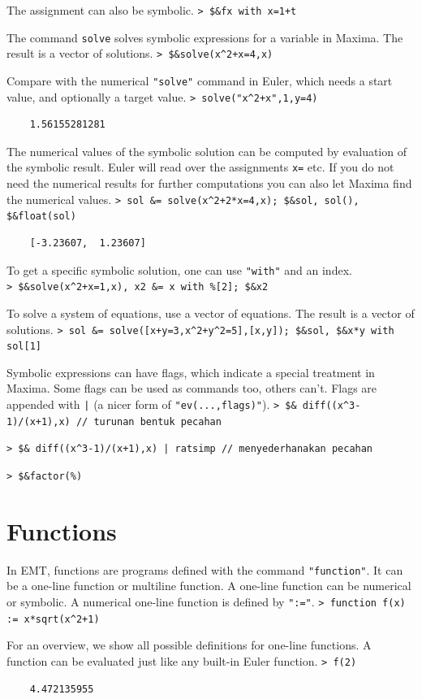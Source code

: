 \documentclass[11pt, a4paper]{article}
\newcommand{\emtcmd}[1]{\noindent\texttt{\textcolor{emtcommand}{>}\ #1}\par\smallskip}
\begin{document}
The assignment can also be symbolic.
\emtcmd{\$\&fx with x=1+t}

The command \texttt{solve} solves symbolic expressions for a variable in Maxima. The result is a vector of solutions.
\emtcmd{\$\&solve(x\^{}2+x=4,x)}

Compare with the numerical \texttt{"solve"} command in Euler, which needs a start value, and optionally a target value.
\emtcmd{solve("x\^{}2+x",1,y=4)}
\begin{verbatim}
    1.56155281281
\end{verbatim}

The numerical values of the symbolic solution can be computed by evaluation of the symbolic result. Euler will read over the assignments \texttt{x=} etc. If you do not need the numerical results for further computations you can also let Maxima find the numerical values.
\emtcmd{sol \&= solve(x\^{}2+2*x=4,x); \$\&sol, sol(), \$\&float(sol)}
\begin{verbatim}
    [-3.23607,  1.23607]
\end{verbatim}

To get a specific symbolic solution, one can use \texttt{"with"} and an index.
\emtcmd{\$\&solve(x\^{}2+x=1,x), x2 \&= x with \%[2]; \$\&x2}

To solve a system of equations, use a vector of equations. The result is a vector of solutions.
\emtcmd{sol \&= solve([x+y=3,x\^{}2+y\^{}2=5],[x,y]); \$\&sol, \$\&x*y with sol[1]}

Symbolic expressions can have flags, which indicate a special treatment in Maxima. Some flags can be used as commands too, others can't. Flags are appended with \texttt{|} (a nicer form of \texttt{"ev(...,flags)"}).
\emtcmd{\$\& diff((x\^{}3-1)/(x+1),x) \textcolor{emtcomment}{// turunan bentuk pecahan}}
\emtcmd{\$\& diff((x\^{}3-1)/(x+1),x) | ratsimp \textcolor{emtcomment}{// menyederhanakan pecahan}}
\emtcmd{\$\&factor(\%)}

\section*{Functions}

In EMT, functions are programs defined with the command \texttt{"function"}. It can be a one-line function or multiline function. A one-line function can be numerical or symbolic. A numerical one-line function is defined by \texttt{":="}.
\emtcmd{function f(x) := x*sqrt(x\^{}2+1)}

For an overview, we show all possible definitions for one-line functions. A function can be evaluated just like any built-in Euler function.
\emtcmd{f(2)}
\begin{verbatim}
    4.472135955
\end{verbatim}
\end{document}

